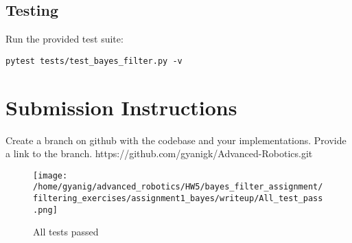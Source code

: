 \documentclass[11pt]{article}
\begin{document}
\subsection{Testing}
Run the provided test suite:
\begin{verbatim}
pytest tests/test_bayes_filter.py -v
\end{verbatim}

\section{Submission Instructions}
Create a branch on github with the codebase and your implementations. Provide a link to the branch.
https://github.com/gyanigk/Advanced-Robotics.git

\begin{figure}[H]
    \centering
    \begin{minipage}[t]{1.0\textwidth}
        \centering
        \texttt{[image: /home/gyanig/advanced\_robotics/HW5/bayes\_filter\_assignment/filtering\_exercises/assignment1\_bayes/writeup/All\_test\_pass.png]}
        \caption{All tests passed}
        \label{fig:gridworld_v0_det_vi}
    \end{minipage}
\end{figure}
\end{document}
